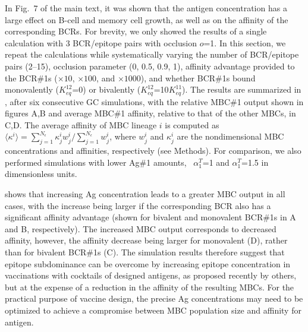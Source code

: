 In Fig.~7 of the main text, it was shown that the antigen concentration has a large effect on B-cell and memory cell
growth, as well as on the affinity of the corresponding BCRs. For brevity, we
only showed the results of a single calculation with
3 BCR/epitope pairs with occlusion $o$=1. In this section, we repeat the calculations while systematically varying the
number of BCR/epitope pairs (2--15), occlusion parameter (0, 0.5, 0.9, 1), affinity advantage provided to the
BCR\#1s ($\times10$, $\times100$, and $\times1000$), and whether BCR\#1s bound monovalently
($K^{12}_{eq}$=0) or bivalently ($K^{12}_{eq}$=10$K^{11}_{eq}$). The
results are summarized in , after six consecutive GC simulations, with the relative MBC\#1 output
shown in figures A,B and average MBC\#1 affinity, relative to that of the other MBCs, in C,D.
The average affinity of MBC lineage $i$ is computed as
$\langle\kappa^i\rangle= \sum_{j=1}^{N_\epsilon} \kappa^i_j w^i_j / \sum_{j=1}^{N_\epsilon} w^i_j$,
where $w^i_j$ and $\kappa_j^i$ are the nondimensional MBC concentrations and affinities, respectively
(see Methods).
For comparison, we also performed simulations with lower Ag\#1 amounts, \ie~$\alpha_1^T$=1 and $\alpha_1^T$=1.5 in
dimensionless units.

 shows that increasing Ag concentration leads to a
greater MBC output in all cases, with the increase being larger if the
corresponding BCR also has a significant affinity advantage (shown for bivalent
and monovalent BCR\#1s in A and B, respectively).
The increased MBC output corresponds to decreased affinity, however, the affinity decrease
being larger for monovalent (D), rather than for bivalent
BCR\#1s (C). The simulation results therefore suggest that
epitope subdominance can be overcome by increasing epitope concentration
in vaccinations with cocktails of designed antigens, as proposed recently by
others,\cite{kanekiyo19,cohen21,glanville20} but at the expense of a
reduction in the affinity of the resulting MBCs.
For the practical purpose of vaccine design, the precise Ag concentrations
may need to be optimized to achieve a compromise between MBC population
size and affinity for antigen.\\

